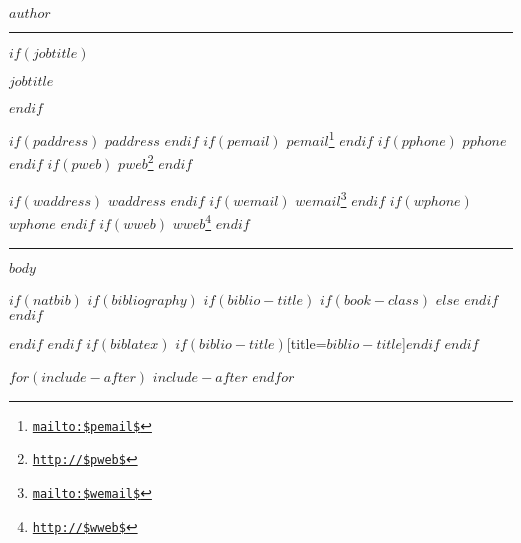 \documentclass[$if(fontsize)$$fontsize$,$endif$$if(lang)$$babel-lang$,$endif$$if(papersize)$$papersize$paper,$endif$$for(classoption)$$classoption$$sep$,$endfor$]{$documentclass$}
\renewcommand{\href}[2]{#2\footnote{\url{#1}}}
\begin{document}
\thispagestyle{firstpage} %
\pagestyle{regular} %

\centerline{\huge \sffamily \bfseries $author$}

\vspace{2mm}
\hrule
\vspace{2mm}

$if(jobtitle)$
\centerline{$jobtitle$}
$endif$

\begin{multicols}{2}
\noindent %
$if(paddress)$
$paddress$
$endif$
$if(pemail)$
\texttt{\href{mailto:$pemail$}{$pemail$}}
$endif$
$if(pphone)$
$pphone$
$endif$
$if(pweb)$
\texttt{\href{http://$pweb$}{$pweb$}}
$endif$

\columnbreak %

$if(waddress)$
$waddress$
$endif$
$if(wemail)$
\texttt{\href{mailto:$wemail$}{$wemail$}}
$endif$
$if(wphone)$
$wphone$
$endif$
$if(wweb)$
\texttt{\href{http://$wweb$}{$wweb$}}
$endif$
\end{multicols}

\vspace{2mm}
\hrule

$body$

$if(natbib)$
$if(bibliography)$
$if(biblio-title)$
$if(book-class)$
\renewcommand\bibname{$biblio-title$}
$else$
\renewcommand\refname{$biblio-title$}
$endif$
$endif$

$endif$
$endif$
$if(biblatex)$
\printbibliography$if(biblio-title)$[title=$biblio-title$]$endif$
$endif$

$for(include-after)$
$include-after$
$endfor$
\end{document}
